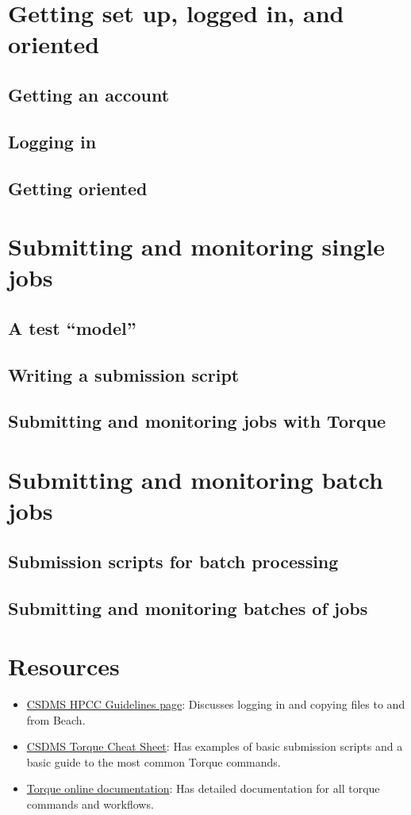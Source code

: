 \documentclass[12pt, oneside]{article}   	%
\begin{document}
\section{Getting set up, logged in, and oriented}
\subsection{Getting an account}
\subsection{Logging in}
\subsection{Getting oriented}

\section{Submitting and monitoring single jobs}
\subsection{A test ``model''}
\subsection{Writing a submission script}
\subsection{Submitting and monitoring jobs with Torque}

\section{Submitting and monitoring batch jobs}
\subsection{Submission scripts for batch processing}
\subsection{Submitting and monitoring batches of jobs}

\section{Resources}
\begin{itemize}
\item \href{https://csdms.colorado.edu/wiki/HPCC_guidelines}{CSDMS HPCC Guidelines page}: Discusses logging in and copying files to and from Beach.
\item \href{https://csdms.colorado.edu/wiki/HPCC_usage_rules}{CSDMS Torque Cheat Sheet}: Has examples of basic submission scripts and a basic guide to the most common Torque commands.
\item \href{http://docs.adaptivecomputing.com/torque/4-0-2/help.htm}{Torque online documentation}: Has detailed documentation for all torque commands and workflows.
\end{itemize}
\end{document}
